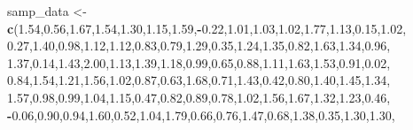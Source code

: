\documentclass[
]{article}
\newenvironment{Shaded}{\begin{snugshade}}{\end{snugshade}}
\newcommand{\FloatTok}[1]{\textcolor[rgb]{0.00,0.00,0.81}{#1}}
\newcommand{\FunctionTok}[1]{\textcolor[rgb]{0.13,0.29,0.53}{\textbf{#1}}}
\newcommand{\NormalTok}[1]{#1}
\newcommand{\OtherTok}[1]{\textcolor[rgb]{0.56,0.35,0.01}{#1}}
\newcommand{\SpecialCharTok}[1]{\textcolor[rgb]{0.81,0.36,0.00}{\textbf{#1}}}
\begin{document}
\begin{Shaded}
\begin{Highlighting}[]
\NormalTok{samp\_data }\OtherTok{\textless{}{-}} \FunctionTok{c}\NormalTok{(}\FloatTok{1.54}\NormalTok{,}\FloatTok{0.56}\NormalTok{,}\FloatTok{1.67}\NormalTok{,}\FloatTok{1.54}\NormalTok{,}\FloatTok{1.30}\NormalTok{,}\FloatTok{1.15}\NormalTok{,}\FloatTok{1.59}\NormalTok{,}\SpecialCharTok{{-}}\FloatTok{0.22}\NormalTok{,}\FloatTok{1.01}\NormalTok{,}\FloatTok{1.03}\NormalTok{,}\FloatTok{1.02}\NormalTok{,}\FloatTok{1.77}\NormalTok{,}\FloatTok{1.13}\NormalTok{,}\FloatTok{0.15}\NormalTok{,}\FloatTok{1.02}\NormalTok{,}
               \FloatTok{0.27}\NormalTok{,}\FloatTok{1.40}\NormalTok{,}\FloatTok{0.98}\NormalTok{,}\FloatTok{1.12}\NormalTok{,}\FloatTok{1.12}\NormalTok{,}\FloatTok{0.83}\NormalTok{,}\FloatTok{0.79}\NormalTok{,}\FloatTok{1.29}\NormalTok{,}\FloatTok{0.35}\NormalTok{,}\FloatTok{1.24}\NormalTok{,}\FloatTok{1.35}\NormalTok{,}\FloatTok{0.82}\NormalTok{,}\FloatTok{1.63}\NormalTok{,}\FloatTok{1.34}\NormalTok{,}\FloatTok{0.96}\NormalTok{,}
               \FloatTok{1.37}\NormalTok{,}\FloatTok{0.14}\NormalTok{,}\FloatTok{1.43}\NormalTok{,}\FloatTok{2.00}\NormalTok{,}\FloatTok{1.13}\NormalTok{,}\FloatTok{1.39}\NormalTok{,}\FloatTok{1.18}\NormalTok{,}\FloatTok{0.99}\NormalTok{,}\FloatTok{0.65}\NormalTok{,}\FloatTok{0.88}\NormalTok{,}\FloatTok{1.11}\NormalTok{,}\FloatTok{1.63}\NormalTok{,}\FloatTok{1.53}\NormalTok{,}\FloatTok{0.91}\NormalTok{,}\FloatTok{0.02}\NormalTok{,}
               \FloatTok{0.84}\NormalTok{,}\FloatTok{1.54}\NormalTok{,}\FloatTok{1.21}\NormalTok{,}\FloatTok{1.56}\NormalTok{,}\FloatTok{1.02}\NormalTok{,}\FloatTok{0.87}\NormalTok{,}\FloatTok{0.63}\NormalTok{,}\FloatTok{1.68}\NormalTok{,}\FloatTok{0.71}\NormalTok{,}\FloatTok{1.43}\NormalTok{,}\FloatTok{0.42}\NormalTok{,}\FloatTok{0.80}\NormalTok{,}\FloatTok{1.40}\NormalTok{,}\FloatTok{1.45}\NormalTok{,}\FloatTok{1.34}\NormalTok{,}
               \FloatTok{1.57}\NormalTok{,}\FloatTok{0.98}\NormalTok{,}\FloatTok{0.99}\NormalTok{,}\FloatTok{1.04}\NormalTok{,}\FloatTok{1.15}\NormalTok{,}\FloatTok{0.47}\NormalTok{,}\FloatTok{0.82}\NormalTok{,}\FloatTok{0.89}\NormalTok{,}\FloatTok{0.78}\NormalTok{,}\FloatTok{1.02}\NormalTok{,}\FloatTok{1.56}\NormalTok{,}\FloatTok{1.67}\NormalTok{,}\FloatTok{1.32}\NormalTok{,}\FloatTok{1.23}\NormalTok{,}\FloatTok{0.46}\NormalTok{,}
               \SpecialCharTok{{-}}\FloatTok{0.06}\NormalTok{,}\FloatTok{0.90}\NormalTok{,}\FloatTok{0.94}\NormalTok{,}\FloatTok{1.60}\NormalTok{,}\FloatTok{0.52}\NormalTok{,}\FloatTok{1.04}\NormalTok{,}\FloatTok{1.79}\NormalTok{,}\FloatTok{0.66}\NormalTok{,}\FloatTok{0.76}\NormalTok{,}\FloatTok{1.47}\NormalTok{,}\FloatTok{0.68}\NormalTok{,}\FloatTok{1.38}\NormalTok{,}\FloatTok{0.35}\NormalTok{,}\FloatTok{1.30}\NormalTok{,}\FloatTok{1.30}\NormalTok{,}

\end{Highlighting}
\end{Shaded}
\end{document}
